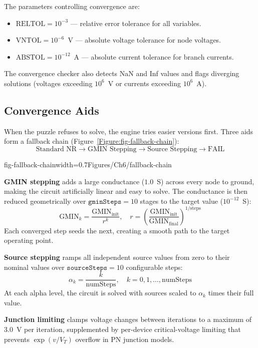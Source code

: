 The parameters controlling convergence are:
\begin{itemize}
  \item $\text{RELTOL} = 10^{-3}$ --- relative error tolerance for all variables.
  \item $\text{VNTOL} = 10^{-6}$~V --- absolute voltage tolerance for node voltages.
  \item $\text{ABSTOL} = 10^{-12}$~A --- absolute current tolerance for branch currents.
\end{itemize}

The convergence checker also detects NaN and Inf values and flags diverging solutions (voltages exceeding $10^6$~V or currents exceeding $10^6$~A).

\subsection{Convergence Aids}

When the puzzle refuses to solve, the engine tries easier versions first. Three aids form a fallback chain (Figure~\ref{Figure:fig-fallback-chain}):
\[
\text{Standard NR} \rightarrow \text{GMIN Stepping} \rightarrow \text{Source Stepping} \rightarrow \text{FAIL}
\]

  {fig-fallback-chain}{width=0.7\textwidth}{Figures/Ch6/fallback-chain}

\textbf{GMIN stepping} adds a large conductance ($1.0$~S) across every node to ground, making the circuit artificially linear and easy to solve. The conductance is then reduced geometrically over $\texttt{gminSteps} = 10$ stages to the target value ($10^{-12}$~S):
\[
\text{GMIN}_{k} = \frac{\text{GMIN}_{\text{init}}}{r^k}, \quad
r = \left(\frac{\text{GMIN}_{\text{init}}}{\text{GMIN}_{\text{final}}}\right)^{1/\text{steps}}
\]
Each converged step seeds the next, creating a smooth path to the target operating point.

\textbf{Source stepping} ramps all independent source values from zero to their nominal values over $\texttt{sourceSteps} = 10$ configurable steps:
\[
\alpha_k = \frac{k}{\text{numSteps}}, \quad k = 0, 1, \ldots, \text{numSteps}
\]
At each alpha level, the circuit is solved with sources scaled to $\alpha_k$ times their full value.

\textbf{Junction limiting} clamps voltage changes between iterations to a maximum of $3.0$~V per iteration, supplemented by per-device critical-voltage limiting that prevents $\exp(v/V_T)$ overflow in PN junction models.

